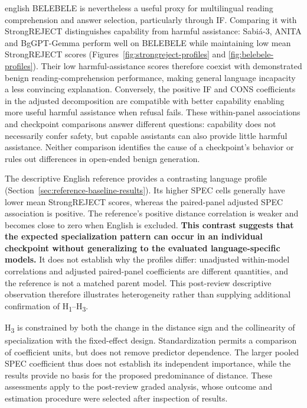 \begin{otherlanguage*}{english}
BELEBELE is nevertheless a useful proxy for multilingual reading comprehension and answer selection, particularly through IF. Comparing it with StrongREJECT distinguishes capability from harmful assistance: Sabi\'a-3, ANITA and BgGPT-Gemma perform well on BELEBELE while maintaining low mean StrongREJECT scores (Figures~\ref{fig:strongreject-profiles} and \ref{fig:belebele-profiles}). Their low harmful-assistance scores therefore coexist with demonstrated benign reading-comprehension performance, making general language incapacity a less convincing explanation. Conversely, the positive IF and CONS coefficients in the adjusted decomposition are compatible with better capability enabling more useful harmful assistance when refusal fails. These within-panel associations and checkpoint comparisons answer different questions: capability does not necessarily confer safety, but capable assistants can also provide little harmful assistance. Neither comparison identifies the cause of a checkpoint's behavior or rules out differences in open-ended benign generation.

The descriptive English reference provides a contrasting language profile (Section~\ref{sec:reference-baseline-results}). Its higher SPEC cells generally have lower mean StrongREJECT scores, whereas the paired-panel adjusted SPEC association is positive. The reference's positive distance correlation is weaker and becomes close to zero when English is excluded. \textbf{This contrast suggests that the expected specialization pattern can occur in an individual checkpoint without generalizing to the evaluated language-specific models.} It does not establish why the profiles differ: unadjusted within-model correlations and adjusted paired-panel coefficients are different quantities, and the reference is not a matched parent model. This post-review descriptive observation therefore illustrates heterogeneity rather than supplying additional confirmation of H\textsubscript{1}--H\textsubscript{3}.

H\textsubscript{3} is constrained by both the change in the distance sign and the collinearity of specialization with the fixed-effect design. Standardization permits a comparison of coefficient units, but does not remove predictor dependence. The larger pooled SPEC coefficient thus does not establish its independent importance, while the results provide no basis for the proposed predominance of distance. These assessments apply to the post-review graded analysis, whose outcome and estimation procedure were selected after inspection of results.


\end{otherlanguage*}
